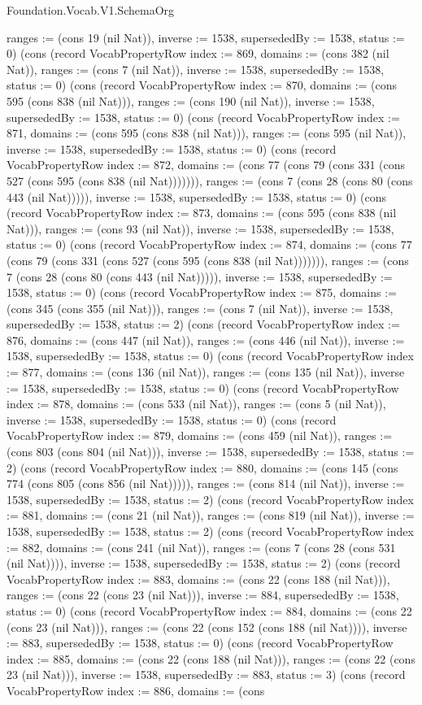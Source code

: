 \begin{lexlean}{Foundation.Vocab.V1.SchemaOrg}
\begin{semanticmodule}
{ranges := (cons 19 (nil Nat)), inverse := 1538, supersededBy := 1538, status := 0}) (cons (record VocabPropertyRow {index := 869, domains := (cons 382 (nil Nat)), ranges := (cons 7 (nil Nat)), inverse := 1538, supersededBy := 1538, status := 0}) (cons (record VocabPropertyRow {index := 870, domains := (cons 595 (cons 838 (nil Nat))), ranges := (cons 190 (nil Nat)), inverse := 1538, supersededBy := 1538, status := 0}) (cons (record VocabPropertyRow {index := 871, domains := (cons 595 (cons 838 (nil Nat))), ranges := (cons 595 (nil Nat)), inverse := 1538, supersededBy := 1538, status := 0}) (cons (record VocabPropertyRow {index := 872, domains := (cons 77 (cons 79 (cons 331 (cons 527 (cons 595 (cons 838 (nil Nat))))))), ranges := (cons 7 (cons 28 (cons 80 (cons 443 (nil Nat))))), inverse := 1538, supersededBy := 1538, status := 0}) (cons (record VocabPropertyRow {index := 873, domains := (cons 595 (cons 838 (nil Nat))), ranges := (cons 93 (nil Nat)), inverse := 1538, supersededBy := 1538, status := 0}) (cons (record VocabPropertyRow {index := 874, domains := (cons 77 (cons 79 (cons 331 (cons 527 (cons 595 (cons 838 (nil Nat))))))), ranges := (cons 7 (cons 28 (cons 80 (cons 443 (nil Nat))))), inverse := 1538, supersededBy := 1538, status := 0}) (cons (record VocabPropertyRow {index := 875, domains := (cons 345 (cons 355 (nil Nat))), ranges := (cons 7 (nil Nat)), inverse := 1538, supersededBy := 1538, status := 2}) (cons (record VocabPropertyRow {index := 876, domains := (cons 447 (nil Nat)), ranges := (cons 446 (nil Nat)), inverse := 1538, supersededBy := 1538, status := 0}) (cons (record VocabPropertyRow {index := 877, domains := (cons 136 (nil Nat)), ranges := (cons 135 (nil Nat)), inverse := 1538, supersededBy := 1538, status := 0}) (cons (record VocabPropertyRow {index := 878, domains := (cons 533 (nil Nat)), ranges := (cons 5 (nil Nat)), inverse := 1538, supersededBy := 1538, status := 0}) (cons (record VocabPropertyRow {index := 879, domains := (cons 459 (nil Nat)), ranges := (cons 803 (cons 804 (nil Nat))), inverse := 1538, supersededBy := 1538, status := 2}) (cons (record VocabPropertyRow {index := 880, domains := (cons 145 (cons 774 (cons 805 (cons 856 (nil Nat))))), ranges := (cons 814 (nil Nat)), inverse := 1538, supersededBy := 1538, status := 2}) (cons (record VocabPropertyRow {index := 881, domains := (cons 21 (nil Nat)), ranges := (cons 819 (nil Nat)), inverse := 1538, supersededBy := 1538, status := 2}) (cons (record VocabPropertyRow {index := 882, domains := (cons 241 (nil Nat)), ranges := (cons 7 (cons 28 (cons 531 (nil Nat)))), inverse := 1538, supersededBy := 1538, status := 2}) (cons (record VocabPropertyRow {index := 883, domains := (cons 22 (cons 188 (nil Nat))), ranges := (cons 22 (cons 23 (nil Nat))), inverse := 884, supersededBy := 1538, status := 0}) (cons (record VocabPropertyRow {index := 884, domains := (cons 22 (cons 23 (nil Nat))), ranges := (cons 22 (cons 152 (cons 188 (nil Nat)))), inverse := 883, supersededBy := 1538, status := 0}) (cons (record VocabPropertyRow {index := 885, domains := (cons 22 (cons 188 (nil Nat))), ranges := (cons 22 (cons 23 (nil Nat))), inverse := 1538, supersededBy := 883, status := 3}) (cons (record VocabPropertyRow {index := 886, domains := (cons }
\end{semanticmodule}
\end{lexlean}
